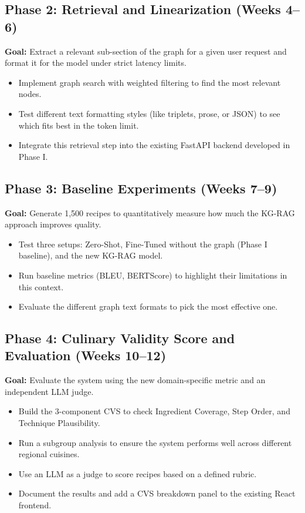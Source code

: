 \documentclass[12pt,a4paper]{article}
\begin{document}
\subsection*{Phase 2: Retrieval and Linearization (Weeks 4--6)}
\textbf{Goal:} Extract a relevant sub-section of the graph for a given user request and format it for the model under strict latency limits.
\begin{itemize}[noitemsep]
    \item Implement graph search with weighted filtering to find the most relevant nodes.
    \item Test different text formatting styles (like triplets, prose, or JSON) to see which fits best in the token limit.
    \item Integrate this retrieval step into the existing FastAPI backend developed in Phase I.
\end{itemize}

\subsection*{Phase 3: Baseline Experiments (Weeks 7--9)}
\textbf{Goal:} Generate 1,500 recipes to quantitatively measure how much the KG-RAG approach improves quality.
\begin{itemize}[noitemsep]
    \item Test three setups: Zero-Shot, Fine-Tuned without the graph (Phase I baseline), and the new KG-RAG model.
    \item Run baseline metrics (BLEU, BERTScore) to highlight their limitations in this context.
    \item Evaluate the different graph text formats to pick the most effective one.
\end{itemize}

\subsection*{Phase 4: Culinary Validity Score and Evaluation (Weeks 10--12)}
\textbf{Goal:} Evaluate the system using the new domain-specific metric and an independent LLM judge.
\begin{itemize}[noitemsep]
    \item Build the 3-component CVS to check Ingredient Coverage, Step Order, and Technique Plausibility.
    \item Run a subgroup analysis to ensure the system performs well across different regional cuisines.
    \item Use an LLM as a judge to score recipes based on a defined rubric.
    \item Document the results and add a CVS breakdown panel to the existing React frontend.
\end{itemize}
\end{document}
